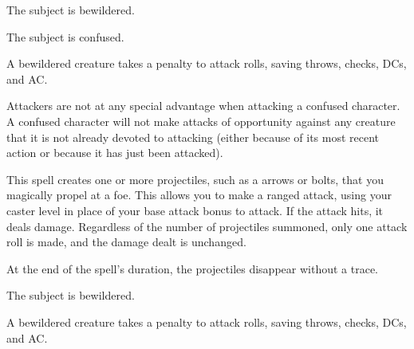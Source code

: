 \begin{spellhealthy}
The subject is bewildered.
\end{spellhealthy}
\begin{spellblood}
The subject is confused. \confusionexplanation
\end{spellblood}
\begin{spellnotes}
A bewildered creature takes a  penalty to attack rolls, saving throws, checks, DCs, and AC.
\par Attackers are not at any special advantage when attacking a confused character. A confused character will not make attacks of opportunity against any creature that it is not already devoted to attacking (either because of its most recent action or because it has just been attacked).
\end{spellnotes}

\spellrng{\rngmed}
\begin{spelleffect}
This spell creates one or more projectiles, such as a arrows or bolts, that you magically propel at a foe. This allows you to make a ranged attack, using your caster level in place of your base attack bonus to attack. If the attack hits, it deals damage. Regardless of the number of projectiles summoned, only one attack roll is made, and the damage dealt is unchanged.
\end{spelleffect}
\begin{spellnotes}
At the end of the spell's duration, the projectiles disappear without a trace.
\end{spellnotes}

\spellrng{\rngclose}
\spelldur{\durshort}
\begin{spellhealthy}
The subject is bewildered.
\end{spellhealthy}
\begin{spellnotes}
A bewildered creature takes a  penalty to attack rolls, saving throws, checks, DCs, and AC.
\end{spellnotes}

